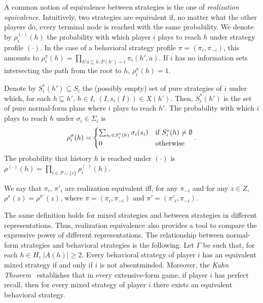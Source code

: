 \noindent
A common notion of equivalence between strategies is the one of \emph{realization equivalence}. Intuitively, two strategies are equivalent if, no matter what the other players do, every terminal node is reached with the same probability. We denote by $\rho_i^{(\cdot)}(h)$ the probability with which player $i$ plays to reach $h$ under strategy profile $(\cdot)$. In the case of a behavioral strategy profile $\pi=(\pi_i,\pi_{-i})$, this amounts to $\rho_i^\pi(h)=\prod_{h'a\sqsubseteq h,P(h')=i}\pi_i(h',a)$. If $i$ has no information sets intersecting the path from the root to $h$, $\rho_i^\pi(h)=1$. 

Denote by $S_i^\ast(h')\subseteq S_i$ the (possibly empty) set of pure strategies of $i$ under which, for each $h\sqsubseteq h'$, $h\in I$,  $(I,s_i(I))\in X(h')$. Then, $S_i^\ast(h')$ is the set of pure normal-form plans where $i$ plays to reach $h'$. The probability with which $i$ plays to reach $h$ under $\sigma_i\in\Sigma_i$ is
\begin{equation}\label{eq:rho}
\rho_i^\sigma(h)=
\begin{cases}
\sum_{s_i\in S_i^\ast(h)}\sigma_i(s_i)& \textnormal{if }S_i^\ast(h)\neq\emptyset\\
0&\textnormal{otherwise}
\end{cases}.
\end{equation}
The probability that history $h$ is reached under $(\cdot)$ is $\rho^{(\cdot)}(h)=\prod_{i\in \mathcal{P}\cup\{c\}}\rho_i^{(\cdot)}(h)$.

\begin{definition}\label{def:realization_eq}
	We say that $\pi_i$, $\pi'_i$ are realization equivalent iff, for any $\pi_{-i}$ and for any $z\in Z$, $\rho^\pi(z)=\rho^{\pi'}(z)$, where $\pi=(\pi_i,\pi_{-i})$ and $\pi'=(\pi'_{i},\pi_{-i})$.
\end{definition}
The same definition holds for mixed strategies and between strategies in different representations. Thus, realization equivalence also provides a tool to compare the expressive power of different representations. The relationship between normal-form strategies and behavioral strategies is the following. Let $\Gamma$ be such that, for each $h\in H$, $|A(h)|\geq 2$. Every behavioral strategy of player $i$ has an equivalent mixed strategy if and only if $i$ is not absentminded. Moreover, the \textit{Kuhn Theorem}~\citep{Kuhn1953} establishes that in every extensive-form game, if player $i$ has perfect recall, then for every mixed strategy of player $i$ there exists an equivalent behavioral strategy.

